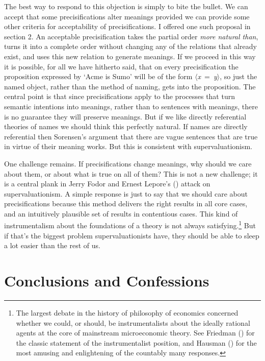 \documentclass[
  10pt,
  letterpaper,
  DIV=11,
  numbers=noendperiod,
  twoside]{scrartcl}
\begin{document}
The best way to respond to this objection is simply to bite the bullet.
We can accept that some precisifications alter meanings provided we can
provide some other criteria for acceptability of precisifications. I
offered one such proposal in section 2. An acceptable precisification
takes the partial order \emph{more natural than}, turns it into a
complete order without changing any of the relations that already exist,
and uses this new relation to generate meanings. If we proceed in this
way it is possible, for all we have hitherto said, that on every
precisification the proposition expressed by `Acme is Sumo' will be of
the form \(\langle\)\emph{x}~=~\emph{y}\(\rangle\), so just the named
object, rather than the method of naming, gets into the proposition. The
central point is that since precisifications apply to the processes that
turn semantic intentions into meanings, rather than to sentences with
meanings, there is no guarantee they will preserve meanings. But if we
like directly referential theories of names we should think this
perfectly natural. If names are directly referential then Sorensen's
argument that there are vague sentences that are true in virtue of their
meaning works. But this is consistent with supervaluationism.

One challenge remains. If precisifications change meanings, why should
we care about them, or about what is true on all of them? This is not a
new challenge; it is a central plank in Jerry Fodor and Ernest Lepore's
() attack on supervaluationism. A simple
response is just to say that we should care about precisifications
because this method delivers the right results in all core cases, and an
intuitively plausible set of results in contentious cases. This kind of
instrumentalism about the foundations of a theory is not always
satisfying.\footnote{The largest debate in the history of philosophy of
  economics concerned whether we could, or should, be instrumentalists
  about the ideally rational agents at the core of mainstream
  microeconomic theory. See Friedman ()
  for the classic statement of the instrumentalist position, and Hausman
  () for the most amusing and
  enlightening of the countably many responses.} But if that's the
biggest problem supervaluationists have, they should be able to sleep a
lot easier than the rest of us.

\section{Conclusions and Confessions}\label{conclusions-and-confessions}
\end{document}
